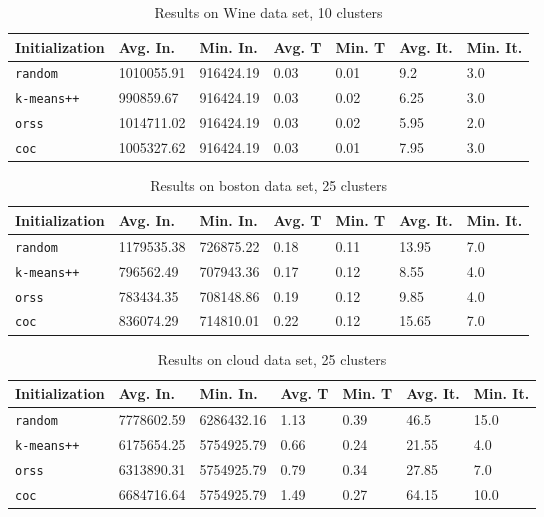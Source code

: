 \documentclass[twoside, 11pt]{article}
\begin{document}
		\begin{table}[p]
			\begin{center}
				\begin{tabular}{|l|l|l|l|l|l|l|}
					\hline
					Initialization & Avg. In. & Min. In. & Avg. T & Min. T & Avg. It. & Min. It.\\\hline
					\texttt{random} & 1010055.91 & 916424.19 & 0.03 & 0.01 & 9.2 & 3.0\\\hline
					\texttt{k-means++} & 990859.67 & 916424.19 & 0.03 & 0.02 & 6.25 & 3.0\\\hline
					\texttt{orss} & 1014711.02 & 916424.19 & 0.03 & 0.02 & 5.95 & 2.0\\\hline
					\texttt{coc} & 1005327.62 & 916424.19 & 0.03 & 0.01 & 7.95 & 3.0\\\hline
				\end{tabular}
				\caption{Results on Wine data set, 10 clusters}
				\label{tbl:Wine10}
			\end{center}
		\end{table}
		
		\begin{table}[p]
			\begin{center}
				\begin{tabular}{|l|l|l|l|l|l|l|}
					\hline
					Initialization & Avg. In. & Min. In. & Avg. T & Min. T & Avg. It. & Min. It.\\\hline
					\texttt{random} & 1179535.38 & 726875.22 & 0.18 & 0.11 & 13.95 & 7.0\\\hline
					\texttt{k-means++} & 796562.49 & 707943.36 & 0.17 & 0.12 & 8.55 & 4.0\\\hline
					\texttt{orss} & 783434.35 & 708148.86 & 0.19 & 0.12 & 9.85 & 4.0\\\hline
					\texttt{coc} & 836074.29 & 714810.01 & 0.22 & 0.12 & 15.65 & 7.0\\\hline
				\end{tabular}
				\caption{Results on boston data set, 25 clusters}
				\label{tbl:boston25}
			\end{center}
		\end{table}
		
		\begin{table}[p]
			\begin{center}
				\begin{tabular}{|l|l|l|l|l|l|l|}
					\hline
					Initialization & Avg. In. & Min. In. & Avg. T & Min. T & Avg. It. & Min. It.\\\hline
					\texttt{random} & 7778602.59 & 6286432.16 & 1.13 & 0.39 & 46.5 & 15.0\\\hline
					\texttt{k-means++} & 6175654.25 & 5754925.79 & 0.66 & 0.24 & 21.55 & 4.0\\\hline
					\texttt{orss} & 6313890.31 & 5754925.79 & 0.79 & 0.34 & 27.85 & 7.0\\\hline
					\texttt{coc} & 6684716.64 & 5754925.79 & 1.49 & 0.27 & 64.15 & 10.0\\\hline
				\end{tabular}
				\caption{Results on cloud data set, 25 clusters}
				\label{tbl:cloud25}
			\end{center}
		\end{table}
		
\end{document}
